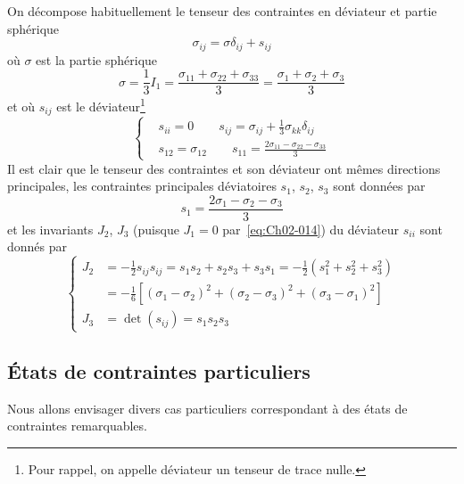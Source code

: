 On décompose habituellement le tenseur des contraintes en déviateur et partie sphérique
\begin{equation}
    \sigma_{ij} = \sigma \delta_{ij} + s_{ij}
    \label{eq:Ch02-012}
\end{equation}
où  $\sigma$ est la partie sphérique
\begin{equation}
    \sigma = \frac{1}{3}I_1 = \frac{\sigma_{11} + \sigma_{22} + \sigma_{33}}{3} = \frac{\sigma_1 + \sigma_2 + \sigma_3}{3}
    \label{eq:Ch02-013}
\end{equation}
et où $s_{ij}$ est le déviateur\footnote{Pour rappel, on appelle déviateur un tenseur de trace nulle.}
\begin{equation}
    \left\{
    \begin{aligned}
        & s_{ii} = 0 \qquad s_{ij} = \sigma_{ij} + \frac{1}{3} \sigma_{kk} \delta_{ij}\\
        & s_{12} = \sigma_{12} \qquad s_{11}= \frac{2\sigma_{11} - \sigma_{22} -\sigma_{33}}{3}
    \end{aligned}
    \right.
    \label{eq:Ch02-014}
\end{equation}
Il est clair que le tenseur des contraintes et son déviateur ont mêmes directions principales, les contraintes principales déviatoires $s_1$, $s_2$, $s_3$ sont données par 
\begin{equation}
    s_1 = \frac{2\sigma_1 - \sigma_2 - \sigma_3}{3}
    \label{eq:Ch02-015}
\end{equation}
et les invariants $J_2$, $J_3$ (puisque $J_1 = 0$ par~\eqref{eq:Ch02-014}) du déviateur $s_{ii}$ sont donnés par 
\begin{equation}
    \left\{
    \begin{aligned}
        J_2 &= -\frac{1}{2}s_{ij}s_{ij}
        = s_1 s_2 + s_2 s_3 + s_3 s_1
        = -\frac{1}{2} \left( s_1^2 + s_2^2 + s_3^2 \right)\\
        &= -\frac{1}{6} \left[ \left( \sigma_1 - \sigma_2 \right)^2 + \left( \sigma_2 - \sigma_3 \right)^2 + \left( \sigma_3 -\sigma_1 \right)^2 \right]\\
        J_3 &= \det \left( s_{ij} \right)  = s_1 s_2 s_3
    \end{aligned}
    \right.
    \label{eq:Ch02-016}
\end{equation}
\subsection{États de contraintes particuliers} \label{ssec:Ch02-1.3}
Nous allons envisager divers cas particuliers correspondant à des états de contraintes remarquables. 
